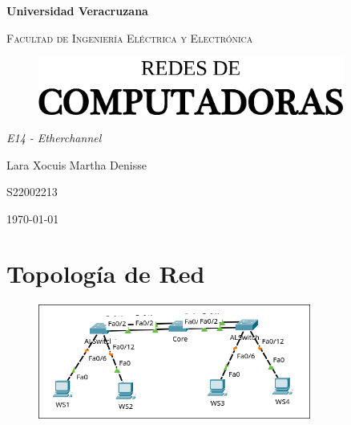\documentclass[letterpaper,12pt]{article}
\begin{document}
\thispagestyle{empty}
\newpage
\setcounter{page}{1}
\pagestyle{headings}
\begin{sloppypar} 
\begin{titlepage}
    \hspace{2.5cm}
    {\bfseries\LARGE Universidad Veracruzana \par}
    \hspace{2cm}
    {\scshape\Large Facultad de Ingeniería Eléctrica y Electrónica \par}
    \begin{center}
        \vspace{5cm}
        \begin{figure}[H]
            \centering 
            \includegraphics[width=0.9\textwidth]{PORTADA.png}
        \end{figure}
        \vspace{2cm}
        {\itshape\Large E14 - Etherchannel \par}
        {\large Lara Xocuis Martha Denisse \par}
        {\large S22002213 \par}
        \vfill
        {\Large \today \par}
    \end{center}
    
\end{titlepage} 

\section{Topología de Red}
\begin{figure}[H]
    \centering 
    \includegraphics[width=0.8\textwidth]{topo1.png}
\end{figure}


\end{sloppypar}
\end{document}
